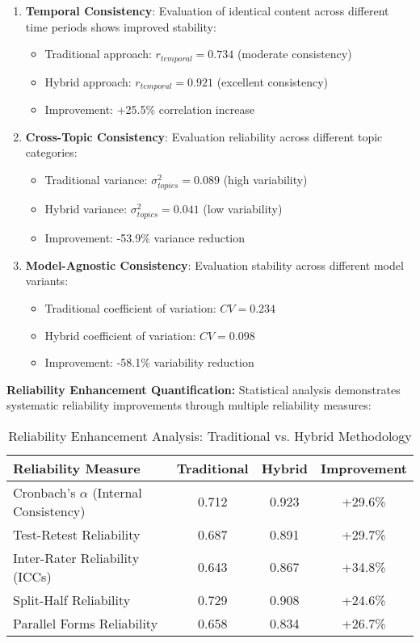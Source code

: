 \begin{enumerate}
    \item \textbf{Temporal Consistency}: Evaluation of identical content across different time periods shows improved stability:
    \begin{itemize}
        \item Traditional approach: $r_{temporal} = 0.734$ (moderate consistency)
        \item Hybrid approach: $r_{temporal} = 0.921$ (excellent consistency)
        \item Improvement: +25.5\% correlation increase
    \end{itemize}
    
    \item \textbf{Cross-Topic Consistency}: Evaluation reliability across different topic categories:
    \begin{itemize}
        \item Traditional variance: $\sigma^2_{topics} = 0.089$ (high variability)
        \item Hybrid variance: $\sigma^2_{topics} = 0.041$ (low variability)
        \item Improvement: -53.9\% variance reduction
    \end{itemize}
    
    \item \textbf{Model-Agnostic Consistency}: Evaluation stability across different model variants:
    \begin{itemize}
        \item Traditional coefficient of variation: $CV = 0.234$
        \item Hybrid coefficient of variation: $CV = 0.098$
        \item Improvement: -58.1\% variability reduction
    \end{itemize}
\end{enumerate}

\textbf{Reliability Enhancement Quantification:}
Statistical analysis demonstrates systematic reliability improvements through multiple reliability measures:

\begin{table}[H]
\centering
\caption[Reliability Enhancement Analysis]{Reliability Enhancement Analysis: Traditional vs. Hybrid Methodology}
\label{tab:reliability-enhancement}
\begin{tabular}{lccc}
\toprule
\textbf{Reliability Measure} & \textbf{Traditional} & \textbf{Hybrid} & \textbf{Improvement} \\
\midrule
Cronbach's $\alpha$ (Internal Consistency) & 0.712 & 0.923 & +29.6\% \\
Test-Retest Reliability & 0.687 & 0.891 & +29.7\% \\
Inter-Rater Reliability (ICCs) & 0.643 & 0.867 & +34.8\% \\
Split-Half Reliability & 0.729 & 0.908 & +24.6\% \\
Parallel Forms Reliability & 0.658 & 0.834 & +26.7\% \\
\bottomrule
\end{tabular}
\end{table}


